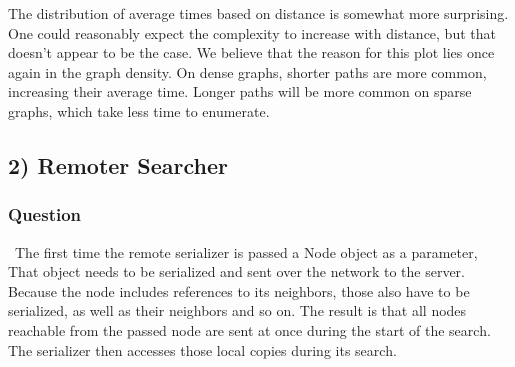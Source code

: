 \documentclass{scrartcl}
\begin{document}
    The distribution of average times based on distance is somewhat more surprising. One could reasonably expect the complexity to increase with distance, but that doesn't appear to be the case. We believe that the reason for this plot lies once again in the graph density. On dense graphs, shorter paths are more common, increasing their average time. Longer paths will be more common on sparse graphs, which take less time to enumerate.
    \subsection*{2) Remoter Searcher}
    \subsubsection*{Question} \
    The first time the remote serializer is passed a Node object as a parameter, That object needs to be serialized and sent over the network to the server. Because the node includes references to its neighbors, those also have to be serialized, as well as their neighbors and so on. The result is that all nodes reachable from the passed node are sent at once during the start of the search. The serializer then accesses those local copies during its search.
\end{document}
